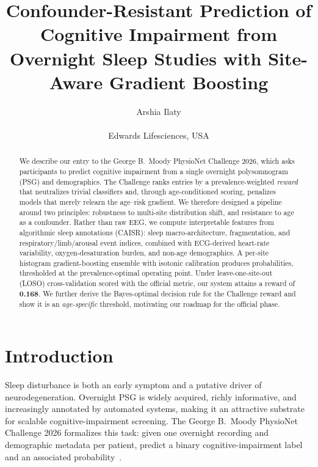 \documentclass{cinc}
\begin{document}


\title{Confounder-Resistant Prediction of Cognitive Impairment from Overnight
Sleep Studies with Site-Aware Gradient Boosting}

\author{Arshia Ilaty \\ \ \\ Edwards Lifesciences, USA}

\maketitle

\begin{abstract}
We describe our entry to the George B.\ Moody PhysioNet Challenge 2026,
which asks participants to predict cognitive impairment from a single
overnight polysomnogram (PSG) and demographics. The Challenge ranks entries
by a prevalence-weighted \emph{reward} that neutralizes trivial classifiers
and, through age-conditioned scoring, penalizes models that merely relearn
the age--risk gradient. We therefore designed a pipeline around two
principles: robustness to multi-site distribution shift, and resistance to
age as a confounder. Rather than raw EEG, we compute interpretable features
from algorithmic sleep annotations (CAISR): sleep macro-architecture,
fragmentation, and respiratory/limb/arousal event indices, combined with
ECG-derived heart-rate variability, oxygen-desaturation burden, and
non-age demographics. A per-site histogram gradient-boosting ensemble with
isotonic calibration produces probabilities, thresholded at the
prevalence-optimal operating point. Under leave-one-site-out (LOSO)
cross-validation scored with the official metric, our system attains a
reward of \textbf{0.168}. We further derive the Bayes-optimal decision rule
for the Challenge reward and show it is an \emph{age-specific} threshold,
motivating our roadmap for the official phase.
\end{abstract}

\section{Introduction}

Sleep disturbance is both an early symptom and a putative driver of
neurodegeneration. Overnight PSG is widely acquired, richly informative, and
increasingly annotated by automated systems, making it an attractive
substrate for scalable cognitive-impairment screening. The George B.\ Moody
PhysioNet Challenge 2026 formalizes this task: given one overnight recording
and demographic metadata per patient, predict a binary cognitive-impairment
label and an associated probability~\cite{challenge2026}.
\end{document}
